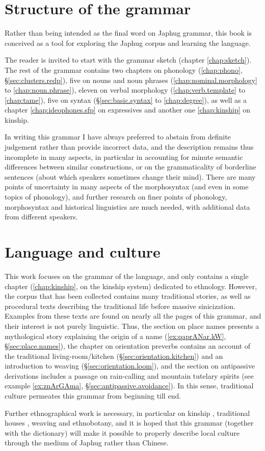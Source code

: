 

\section{Structure of the grammar}
Rather than being intended as the final word on Japhug grammar, this book is conceived as a tool for exploring  the Japhug corpus and learning the language. 

The reader is invited to start with the grammar sketch (chapter \ref{chap:sketch}). The rest of the grammar contains two chapters on phonology (\ref{chap:phono}, §\ref{sec:clusters.redp}), five on nouns and noun phrases (\ref{chap:nominal.morphology} to \ref{chap:noun.phrase}), eleven on verbal morphology (\ref{chap:verb.template} to \ref{chap:tame}), five on syntax (§\ref{sec:basic.syntax} to \ref{chap:degree}), as well as a chapter \ref{chap:ideophones.sfp} on expressives and another one \ref{chap:kinship} on kinship.

In writing this grammar I have always preferred to abstain from definite judgement rather than provide incorrect data, and the description remains thus incomplete in many aspects, in particular in accounting for minute semantic differences between similar constructions, or on the grammaticality of borderline sentences (about which speakers sometimes change their mind). There are many points of uncertainty in many aspects of the morphosyntax (and even in some topics of phonology), and further research on finer points of phonology, morphosyntax and historical linguistics are much needed, with additional data from different speakers.

\section{Language and culture}
This work focuses on the grammar of the language, and only contains a single chapter (\ref{chap:kinship}, on the kinship system) dedicated to ethnology. However, the corpus that has been collected contains many traditional stories, as well as procedural texts describing the traditional life before massive sinicization. Examples from these texts are found on nearly all the pages of this grammar, and their interest is not purely linguistic. Thus, the section on place names presents a mythological story explaining the origin of a name (\ref{ex:qaprANar.kW}, §\ref{sec:place.names}), the chapter on orientation preverbs contains an account of the traditional living-room/kitchen (§\ref{sec:orientation.kitchen}) and an introduction to weaving (§\ref{sec:orientation.loom}), and the section on antipassive derivations includes a passage on rain-calling and mountain tutelary spirits  (see example \ref{ex:znArGAma}, §\ref{sec:antipassive.avoidance}). In this sense, traditional culture permeates this grammar from beginning till end.

Further ethnographical work is necessary, in particular on kinship \citep{zhangsy20kinship}, traditional houses \citep{dongsy18chabao}, weaving and ethnobotany, and it is hoped that this grammar (together with the dictionary) will make it possible to properly describe local culture through the medium of Japhug rather than Chinese.

